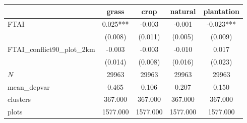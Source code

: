 {
\def\sym#1{\ifmmode^{#1}\else\(^{#1}\)\fi}
\begin{tabular}{l*{4}{c}}
\toprule
          &\multicolumn{1}{c}{grass}&\multicolumn{1}{c}{crop}&\multicolumn{1}{c}{natural}&\multicolumn{1}{c}{plantation}\\
\midrule
FTAI      &    0.025***&   -0.003   &   -0.001   &   -0.023***\\
          &  (0.008)   &  (0.011)   &  (0.005)   &  (0.009)   \\
\addlinespace
FTAI\_conflict90\_plot\_2km&   -0.003   &   -0.003   &   -0.010   &    0.017   \\
          &  (0.014)   &  (0.008)   &  (0.016)   &  (0.023)   \\
\midrule
\(N\)     &    29963   &    29963   &    29963   &    29963   \\
mean\_depvar&    0.465   &    0.106   &    0.207   &    0.150   \\
clusters  &  367.000   &  367.000   &  367.000   &  367.000   \\
plots     & 1577.000   & 1577.000   & 1577.000   & 1577.000   \\
\bottomrule
\end{tabular}
}
